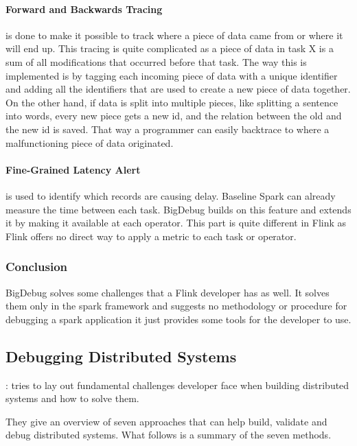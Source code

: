 \paragraph{Forward and Backwards Tracing} is done to make it possible to track where a piece of data came from or where it will end up. This tracing is quite complicated as a piece of data in task X is a sum of all modifications that occurred before that task. The way this is implemented is by tagging each incoming piece of data with a unique identifier and adding all the identifiers that are used to create a new piece of data together. On the other hand, if data is split into multiple pieces, like splitting a sentence into words, every new piece gets a new id, and the relation between the old and the new id is saved. That way a programmer can easily backtrace to where a malfunctioning piece of data originated.

\paragraph{Fine-Grained Latency Alert} is used to identify which records are causing delay. Baseline Spark can already measure the time between each task. BigDebug builds on this feature and extends it by making it available at each operator. This part is quite different in Flink as Flink offers no direct way to apply a metric to each task or operator.

\subsubsection{Conclusion}
BigDebug solves some challenges that a Flink developer has as well. It solves them only in the spark framework and suggests no methodology or procedure for debugging a spark application it just provides some tools for the developer to use.

\subsection{Debugging Distributed Systems}
\label{debuggingDistributedSystems}

\cite{Beschastnikh:2016:DDS:2927299.2940294}: tries to lay out fundamental challenges developer face when building distributed systems and how to solve them.

They give an overview of seven approaches that can help build, validate and debug distributed systems. What follows is a summary of the seven methods.

